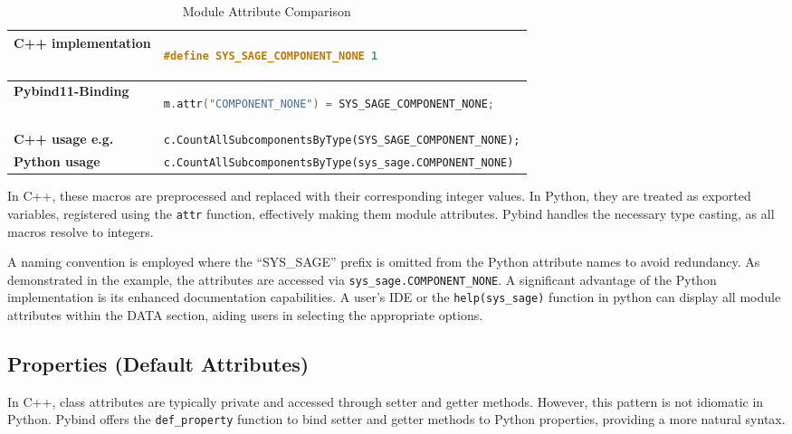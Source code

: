 \begin{table}[htbp]
\centering
\begin{tabular}{|l|l|}
\hline
\textbf{C++ implementation} & \begin{lstlisting}[language=C++]
#define SYS_SAGE_COMPONENT_NONE 1 
\end{lstlisting} \\ \hline
\textbf{Pybind11-Binding} & \begin{lstlisting}[language=C++]
m.attr("COMPONENT_NONE") = SYS_SAGE_COMPONENT_NONE;
\end{lstlisting} \\ \hline
\textbf{C++ usage e.g.} & \verb|c.CountAllSubcomponentsByType(SYS_SAGE_COMPONENT_NONE);| \\ \hline
\textbf{Python usage} & \verb|c.CountAllSubcomponentsByType(sys_sage.COMPONENT_NONE)| \\ \hline
\end{tabular}
\caption{Module Attribute Comparison}
\label{tab:module_attributes}
\end{table}

In C++, these macros are preprocessed and replaced with their corresponding integer values. In Python, they are treated as exported variables, registered using the \verb|attr| function, effectively making them module attributes. Pybind handles the necessary type casting, as all macros resolve to integers.\cite[see The Basics/First Steps]{pybind11-docu}

A naming convention is employed where the “SYS\_SAGE” prefix is omitted from the Python attribute names to avoid redundancy. As demonstrated in the example, the attributes are accessed via \verb|sys_sage.COMPONENT_NONE|.
A significant advantage of the Python implementation is its enhanced documentation capabilities. A user's \ac{IDE} or the \verb|help(sys_sage)| function in python can display all module attributes within the DATA section, aiding users in selecting the appropriate options.

\subsection{Properties (Default Attributes)}

In C++, class attributes are typically private and accessed through setter and getter methods. However, this pattern is not idiomatic in Python. Pybind offers the \verb|def_property| function to bind setter and getter methods to Python properties, providing a more natural syntax. \cite[see The Basics/Object-Oriented Code]{pybind11-docu}

